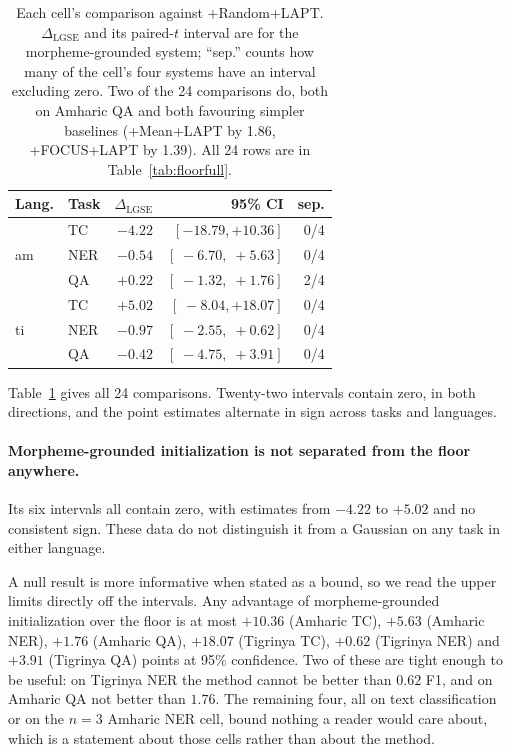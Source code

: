 \documentclass[11pt]{article}
\begin{document}
\begin{table}[t]
\centering
\small
\setlength{\tabcolsep}{4pt}
\begin{tabular}{llrrr}
\toprule
Lang. & Task & $\Delta_{\text{LGSE}}$ & 95\% CI & sep. \\
\midrule
\multirow{3}{*}{am}
 & TC  & $-4.22$ & $[-18.79, +10.36]$ & 0/4 \\
 & NER & $-0.54$ & $[\;-6.70, \;+5.63]$ & 0/4 \\
 & QA  & $+0.22$ & $[\;-1.32, \;+1.76]$ & 2/4 \\
\midrule
\multirow{3}{*}{ti}
 & TC  & $+5.02$ & $[\;-8.04, +18.07]$ & 0/4 \\
 & NER & $-0.97$ & $[\;-2.55, \;+0.62]$ & 0/4 \\
 & QA  & $-0.42$ & $[\;-4.75, \;+3.91]$ & 0/4 \\
\bottomrule
\end{tabular}
\caption{Each cell's comparison against +Random+LAPT. $\Delta_{\text{LGSE}}$
and its paired-$t$ interval are for the morpheme-grounded system; ``sep.''
counts how many of the cell's four systems have an interval excluding zero.
Two of the 24 comparisons do, both on Amharic QA and both favouring simpler
baselines (+Mean+LAPT by 1.86, +FOCUS+LAPT by 1.39). All 24 rows are in
Table~\ref{tab:floorfull}.}
\label{tab:floor}
\end{table}

Table~\ref{tab:floor} gives all 24 comparisons. Twenty-two intervals contain
zero, in both directions, and the point estimates alternate in sign across
tasks and languages.

\paragraph{Morpheme-grounded initialization is not separated from the floor
anywhere.} Its six intervals all contain zero, with estimates from $-4.22$ to
$+5.02$ and no consistent sign. These data do not distinguish it from a
Gaussian on any task in either language.

A null result is more informative when stated as a bound, so we read the
upper limits directly off the intervals. Any advantage of morpheme-grounded
initialization over the floor is at most $+10.36$ (Amharic TC), $+5.63$
(Amharic NER), $+1.76$ (Amharic QA), $+18.07$ (Tigrinya TC), $+0.62$
(Tigrinya NER) and $+3.91$ (Tigrinya QA) points at 95\% confidence. Two of
these are tight enough to be useful: on Tigrinya NER the method cannot be
better than $0.62$ F1, and on Amharic QA not better than $1.76$. The
remaining four, all on text classification or on the $n=3$ Amharic NER cell,
bound nothing a reader would care about, which is a statement about those
cells rather than about the method.
\end{document}
